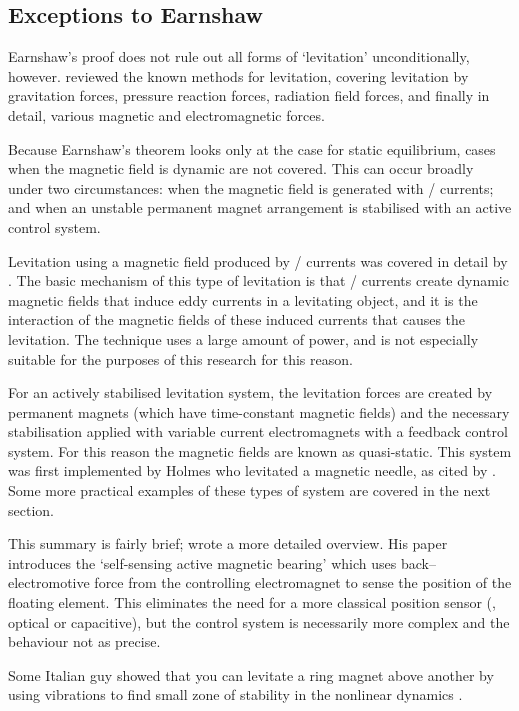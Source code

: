 \subsection{Exceptions to Earnshaw}

Earnshaw's proof does not rule out all forms of `levitation' unconditionally,
however. \textcite{boerdijk1956a} reviewed the known methods for levitation,
covering levitation by gravitation forces, pressure reaction forces, radiation
field forces, and finally in detail, various magnetic and electromagnetic
forces.

Because Earnshaw's theorem looks only at the case for static equilibrium,
cases when the magnetic field is dynamic are not covered. This can occur
broadly under two circumstances: when the magnetic field is generated with
\AC/ currents; and when an unstable permanent magnet arrangement is stabilised
with an active control system.

Levitation using a magnetic field produced by \AC/ currents was covered in
detail by \textcite{laithwaite1965}. The basic mechanism of this type of
levitation is that \AC/ currents create dynamic magnetic fields that induce
eddy currents in a levitating object, and it is the interaction of the
magnetic fields of these induced currents that causes the levitation. The
technique uses a large amount of power, and is not especially suitable for the
purposes of this research for this reason.

For an actively stabilised levitation system, the levitation forces are
created by permanent magnets (which have time-constant magnetic fields) and
the necessary stabilisation applied with variable current electromagnets with
a feedback control system. For this reason the magnetic fields are known as
quasi-static. This system was first implemented by Holmes who levitated a
magnetic needle, as cited by \textcite{boerdijk1956a}. Some more practical
examples of these types of system are covered in the next section.

This summary is fairly brief; \textcite{bleuler1992} wrote a more detailed
overview. His paper introduces the `self-sensing active magnetic bearing'
\cite{vischer1993} which uses back--electromotive force from the controlling
electromagnet to sense the position of the floating element. This eliminates
the need for a more classical position sensor (\eg, optical or capacitive),
but the control system is necessarily more complex and the behaviour not as
precise.

Some Italian guy showed that you can levitate a ring magnet above another by
using vibrations to find small zone of stability in the nonlinear dynamics
\cite{bassani2007}.

